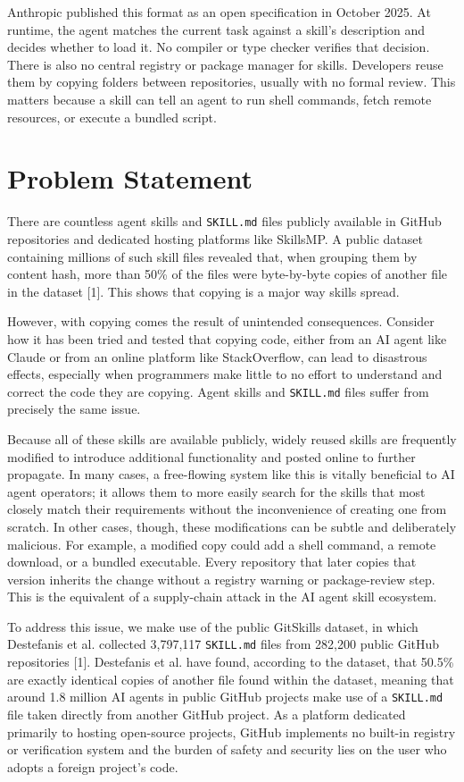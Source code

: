 \documentclass[sigconf,review]{acmart}
\begin{document}
Anthropic published this format as an open specification in October 2025. At runtime, the agent matches the current task against a skill’s description and decides whether to load it. No compiler or type checker verifies that decision. There is also no central registry or package manager for skills. Developers reuse them by copying folders between repositories, usually with no formal review. This matters because a skill can tell an agent to run shell commands, fetch remote resources, or execute a bundled script.

\section{Problem Statement}
\label{Section:Problem}
There are countless agent skills and \texttt{SKILL.md} files publicly available in GitHub repositories and dedicated hosting platforms like SkillsMP. A public dataset containing millions of such skill files revealed that, when grouping them by content hash, more than 50\% of the files were byte-by-byte copies of another file in the dataset [1]. This shows that copying is a major way skills spread. 

However, with copying comes the result of unintended consequences. Consider how it has been tried and tested that copying code, either from an AI agent like Claude or from an online platform like StackOverflow, can lead to disastrous effects, especially when programmers make little to no effort to understand and correct the code they are copying. Agent skills and \texttt{SKILL.md} files suffer from precisely the same issue.

Because all of these skills are available publicly, widely reused skills are frequently modified to introduce additional functionality and posted online to further propagate. In many cases, a free-flowing system like this is vitally beneficial to AI agent operators; it allows them to more easily search for the skills that most closely match their requirements without the inconvenience of creating one from scratch. In other cases, though, these modifications can be subtle and deliberately malicious. For example, a modified copy could add a shell command, a remote download, or a bundled executable. Every repository that later copies that version inherits the change without a registry warning or package-review step. This is the equivalent of a supply-chain attack in the AI agent skill ecosystem.

To address this issue, we make use of the public GitSkills dataset, in which Destefanis et al. collected 3,797,117 \texttt{SKILL.md} files from 282,200 public GitHub repositories [1]. Destefanis et al. have found, according to the dataset, that 50.5\% are exactly identical copies of another file found within the dataset, meaning that around 1.8 million AI agents in public GitHub projects make use of a \texttt{SKILL.md} file taken directly from another GitHub project. As a platform dedicated primarily to hosting open-source projects, GitHub implements no built-in registry or verification system and the burden of safety and security lies on the user who adopts a foreign project's code.
\end{document}
